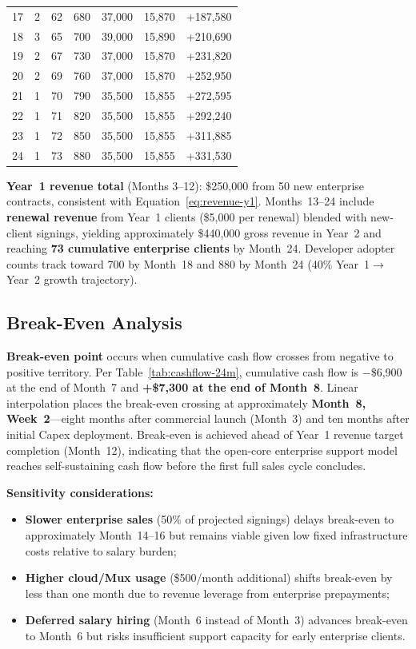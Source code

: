 \begin{longtable}{@{}r r r r r r r@{}}
  17 & 2  & 62  & 680   & 37,000  & 15,870  & +187,580 \\
  18 & 3  & 65  & 700   & 39,000  & 15,890  & +210,690 \\
  19 & 2  & 67  & 730   & 37,000  & 15,870  & +231,820 \\
  20 & 2  & 69  & 760   & 37,000  & 15,870  & +252,950 \\
  21 & 1  & 70  & 790   & 35,500  & 15,855  & +272,595 \\
  22 & 1  & 71  & 820   & 35,500  & 15,855  & +292,240 \\
  23 & 1  & 72  & 850   & 35,500  & 15,855  & +311,885 \\
  24 & 1  & 73  & 880   & 35,500  & 15,855  & +331,530 \\
\end{longtable}

\textbf{Year~1 revenue total} (Months 3--12): \$250,000 from 50 new enterprise contracts, consistent with Equation~\ref{eq:revenue-y1}. Months~13--24 include \textbf{renewal revenue} from Year~1 clients (\$5,000 per renewal) blended with new-client signings, yielding approximately \$440,000 gross revenue in Year~2 and reaching \textbf{73 cumulative enterprise clients} by Month~24. Developer adopter counts track toward 700 by Month~18 and 880 by Month~24 (40\% Year~1$\rightarrow$Year~2 growth trajectory).

\subsection{Break-Even Analysis}
\label{subsec:break-even}

\textbf{Break-even point} occurs when cumulative cash flow crosses from negative to positive territory. Per Table~\ref{tab:cashflow-24m}, cumulative cash flow is $-$\$6,900 at the end of Month~7 and \textbf{+\$7,300 at the end of Month~8}. Linear interpolation places the break-even crossing at approximately \textbf{Month~8, Week~2}---eight months after commercial launch (Month~3) and ten months after initial Capex deployment. Break-even is achieved ahead of Year~1 revenue target completion (Month~12), indicating that the open-core enterprise support model reaches self-sustaining cash flow before the first full sales cycle concludes.

\textbf{Sensitivity considerations:}
\begin{itemize}
  \item \textbf{Slower enterprise sales} (50\% of projected signings) delays break-even to approximately Month~14--16 but remains viable given low fixed infrastructure costs relative to salary burden;
  \item \textbf{Higher cloud/Mux usage} (\$500/month additional) shifts break-even by less than one month due to revenue leverage from enterprise prepayments;
  \item \textbf{Deferred salary hiring} (Month~6 instead of Month~3) advances break-even to Month~6 but risks insufficient support capacity for early enterprise clients.
\end{itemize}

